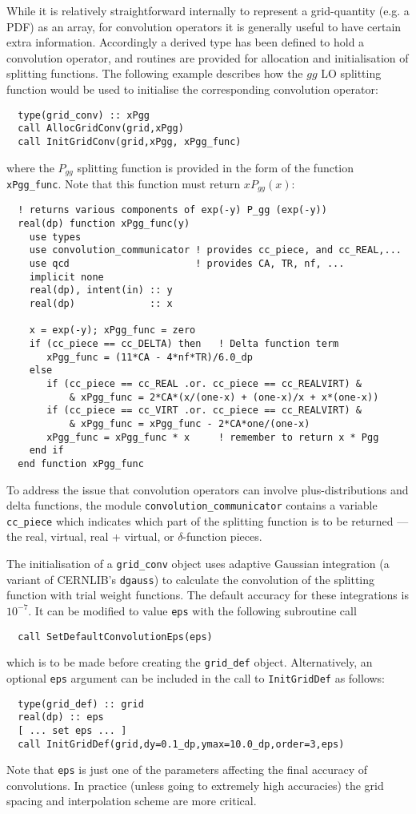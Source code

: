 \documentclass[12pt]{article}
\newcommand{\ttt}[1]{\texttt{#1}}
\begin{document}
While it is relatively straightforward internally to represent a
grid-quantity (e.g. a PDF) as an array, for convolution
operators  it is generally useful to have certain extra
information. Accordingly a derived type has been defined to hold a
convolution operator, and routines are provided for allocation and
initialisation of splitting functions.
%
The following example describes how the $gg$ LO splitting function
would be used to initialise the corresponding 
convolution operator:
\begin{lstlisting}
  type(grid_conv) :: xPgg
  call AllocGridConv(grid,xPgg)
  call InitGridConv(grid,xPgg, xPgg_func)
\end{lstlisting}
where the $P_{gg}$ splitting function is provided in the form of the
function \texttt{xPgg\_func}. Note that this function
must return $xP_{gg}(x)$:
\begin{lstlisting}
  ! returns various components of exp(-y) P_gg (exp(-y))
  real(dp) function xPgg_func(y)
    use types
    use convolution_communicator ! provides cc_piece, and cc_REAL,...
    use qcd                      ! provides CA, TR, nf, ...
    implicit none
    real(dp), intent(in) :: y
    real(dp)             :: x

    x = exp(-y); xPgg_func = zero
    if (cc_piece == cc_DELTA) then   ! Delta function term
       xPgg_func = (11*CA - 4*nf*TR)/6.0_dp
    else
       if (cc_piece == cc_REAL .or. cc_piece == cc_REALVIRT) & 
           & xPgg_func = 2*CA*(x/(one-x) + (one-x)/x + x*(one-x))
       if (cc_piece == cc_VIRT .or. cc_piece == cc_REALVIRT) & 
           & xPgg_func = xPgg_func - 2*CA*one/(one-x)
       xPgg_func = xPgg_func * x     ! remember to return x * Pgg
    end if
  end function xPgg_func
\end{lstlisting}
To address the issue that convolution operators can involve
plus-distributions and delta functions, the module
\texttt{convolution\_communicator} contains a variable
\texttt{cc\_piece} which indicates which part of the splitting
function is to be returned --- the real, virtual, real + virtual, or
$\delta$-function pieces. 

The initialisation of a \texttt{grid\_conv} object uses adaptive
Gaussian integration (a variant of CERNLIB's \texttt{dgauss}) to
calculate the convolution of the splitting function with trial weight
functions. The default accuracy for these integrations is $10^{-7}$.
It can be modified to value \texttt{eps} with the following subroutine
call
\begin{lstlisting}
  call SetDefaultConvolutionEps(eps)
\end{lstlisting}
which is to be made before creating the \ttt{grid\_def}
object. Alternatively, an optional \ttt{eps} argument can be
  included in the call to \ttt{InitGridDef} as follows:
\begin{lstlisting}
  type(grid_def) :: grid
  real(dp) :: eps
  [ ... set eps ... ]
  call InitGridDef(grid,dy=0.1_dp,ymax=10.0_dp,order=3,eps)
\end{lstlisting}
Note that {\tt eps} is just
one of the parameters affecting the final accuracy of convolutions. In
practice (unless going to extremely high accuracies) the grid spacing
and interpolation scheme are more critical.
\end{document}
